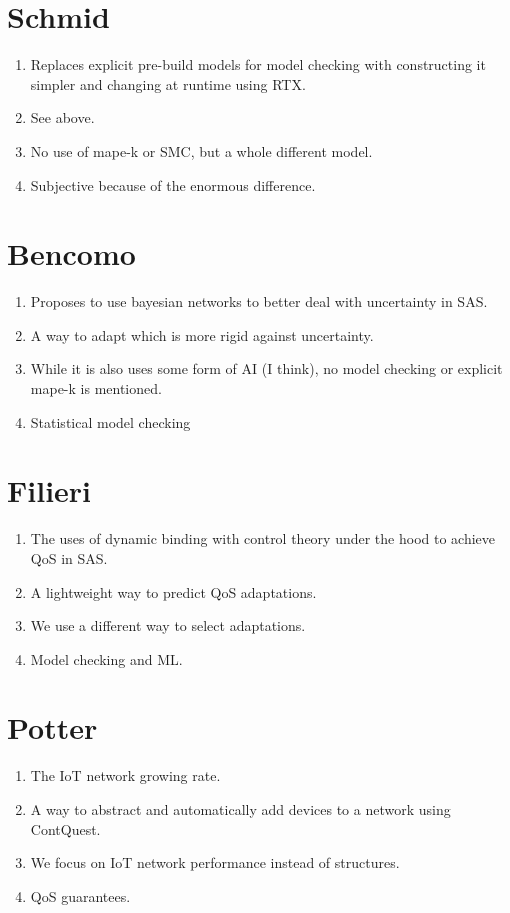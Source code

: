 \documentclass[12pt]{article}
\begin{document}
\section{Schmid}
\begin{enumerate}
    \item Replaces explicit pre-build models for model checking with constructing it simpler and changing at runtime using RTX.
    \item See above.
    \item No use of mape-k or SMC, but a whole different model.
    \item Subjective because of the enormous difference.
\end{enumerate}

\section{Bencomo}
\begin{enumerate}
    \item Proposes to use bayesian networks to better deal with uncertainty in SAS.
    \item A way to adapt which is more rigid against uncertainty.
    \item While it is also uses some form of AI (I think), no model checking or explicit mape-k is mentioned.
    \item Statistical model checking
\end{enumerate}

\section{Filieri}
\begin{enumerate}
    \item The uses of dynamic binding with control theory under the hood to achieve QoS in SAS.
    \item A lightweight way to predict QoS adaptations.
    \item We use a different way to select adaptations.
    \item Model checking and ML.
\end{enumerate}

\section{Potter}
\begin{enumerate}
    \item The IoT network growing rate.
    \item A way to abstract and automatically add devices to a network using ContQuest.
    \item We focus on IoT network performance instead of structures.
    \item QoS guarantees.
\end{enumerate}
\end{document}

